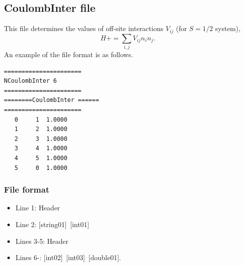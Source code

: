 \newpage
\subsection{CoulombInter file}
This file determines the values of off-site interactions $V_{ij}$ {(for $S=1/2$ system)},
\begin{equation}
H+=\sum_{i,j}V_{ij} n_ {i}n_{j}.
\end{equation}
An example of the file format is as follows.

\begin{minipage}{12.5cm}
\begin{screen}
\begin{verbatim}
====================== 
NCoulombInter 6  
====================== 
========CoulombInter ====== 
====================== 
   0     1  1.0000
   1     2  1.0000
   2     3  1.0000
   3     4  1.0000
   4     5  1.0000
   5     0  1.0000
\end{verbatim}
\end{screen}
\end{minipage}

\subsubsection{File format}
 \begin{itemize}
   \item  Line 1:  Header
   \item  Line 2:   [string01]~[int01]
   \item  Lines 3-5:  Header
   \item  Lines 6-: 
   [int02]~[int03]~[double01].
  \end{itemize}
